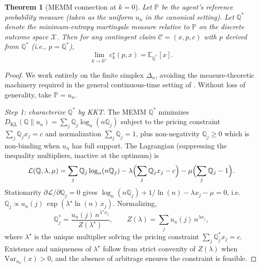 \documentclass[11pt]{article}
\newtheorem{theorem}{Theorem}
\theoremstyle{definition}
\theoremstyle{remark}
\newcommand{\E}{\mathbb{E}}
\newcommand{\PP}{\mathbb{P}}
\newcommand{\Q}{\mathbb{Q}}
\newcommand{\C}{\mathcal{C}}
\newcommand{\X}{\mathcal{X}}
\newcommand{\KL}{D_{\mathrm{KL}}}
\begin{document}
\begin{theorem}[MEMM connection at $k = 0$]\label{thm:memm}
Let $\PP$ be the agent's reference probability measure (taken as the
uniform $u_n$ in the canonical setting). Let $\Q^*$ denote the
minimum-entropy martingale measure relative to $\PP$ on the discrete
outcome space $\X$. Then for any contingent claim $\C = (x, p, c)$
with $p$ derived from $\Q^*$ (i.e., $p = \Q^*$),
\begin{equation*}
\lim_{k \to 0^+} c^\star_k(p, x) = \E_{\Q^*}[x].
\end{equation*}
\end{theorem}

\begin{proof}
We work entirely on the finite simplex $\Delta_n$, avoiding the
measure-theoretic machinery required in the general continuous-time
setting of \citet{frittelli2000}. Without loss of generality, take
$\PP = u_n$.

\emph{Step 1: characterize $\Q^*$ by KKT.} The MEMM $\Q^*$ minimizes
$\KL(\Q \| u_n) = \sum_j \Q_j \log_n(n \Q_j)$ subject to the pricing
constraint $\sum_j \Q_j x_j = c$ and normalization $\sum_j \Q_j = 1$,
plus non-negativity $\Q_j \ge 0$ which is non-binding when $u_n$ has
full support. The Lagrangian (suppressing the inequality multipliers,
inactive at the optimum) is
\begin{equation*}
\mathcal{L}(\Q, \lambda, \mu) = \sum_j \Q_j \log_n(n \Q_j)
   - \lambda \Bigl( \sum_j \Q_j x_j - c \Bigr)
   - \mu \Bigl( \sum_j \Q_j - 1 \Bigr).
\end{equation*}
Stationarity $\partial \mathcal{L} / \partial \Q_j = 0$ gives
$\log_n(n \Q_j) + 1/\ln(n) - \lambda x_j - \mu = 0$, i.e.\
$\Q_j \propto u_n(j) \, \exp(\lambda^\star \ln(n) \, x_j)$.
Normalizing,
\begin{equation}
\Q^*_j = \frac{u_n(j) \, n^{\lambda^\star x_j}}{Z(\lambda^\star)},
\qquad
Z(\lambda) = \sum_j u_n(j) \, n^{\lambda x_j},
\label{eq:memm-exp-tilt}
\end{equation}
where $\lambda^\star$ is the unique multiplier solving the pricing
constraint $\sum_j \Q^*_j x_j = c$. Existence and uniqueness of
$\lambda^\star$ follow from strict convexity of $Z(\lambda)$ when
$\mathrm{Var}_{u_n}(x) > 0$, and the absence of arbitrage ensures the
constraint is feasible.


\end{proof}
\end{document}
